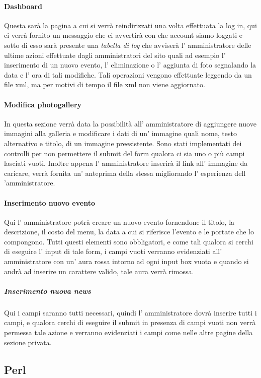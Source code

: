 \paragraph{Dashboard}
Questa sarà la pagina a cui si verrà reindirizzati una volta effettuata la log in, qui ci verrà fornito un messaggio che ci avvertirà con che account siamo loggati e sotto di esso sarà presente una \emph{tabella di log} che avviserà l' amministratore delle ultime azioni effettuate dagli amministratori del sito quali ad esempio l' inserimento di un nuovo evento, l' eliminazione o l' aggiunta di foto segnalando la data e l' ora di tali modifiche. Tali operazioni vengono effettuate leggendo da un file xml, ma per motivi di tempo il file xml non viene aggiornato.
\paragraph{Modifica photogallery}
In questa sezione verrà data la possibilità all' amministratore di aggiungere nuove immagini alla galleria e modificare i dati di un' immagine quali nome, testo alternativo e titolo, di un immagine preesistente. Sono stati implementati dei controlli per non permettere il submit del form qualora ci sia uno o più campi lasciati vuoti. Inoltre appena l' amministratore inserirà il link all' immagine da caricare, verrà fornita un' anteprima della stessa migliorando l' esperienza dell 'amministratore.
\paragraph{Inserimento nuovo evento}
Qui l' amministratore potrà creare un nuovo evento fornendone il titolo, la descrizione, il costo del menu, la data a cui si riferisce l'evento e le portate che lo compongono. Tutti questi elementi sono obbligatori, e come tali qualora si cerchi di eseguire l' input di tale form, i campi vuoti verranno evidenziati all' amministratore con un' aura rossa intorno ad ogni input box vuota e quando si andrà ad inserire un carattere valido, tale aura verrà rimossa.
\subparagraph{Inserimento nuova news}
Qui i campi saranno tutti necessari, quindi l' amministratore dovrà inserire tutti i campi, e qualora cerchi di eseguire il submit in presenza di campi vuoti non verrà permessa tale azione e verranno evidenziati i campi come nelle altre pagine della sezione privata.

\subsection{Perl}

